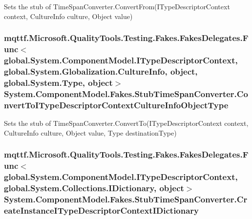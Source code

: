 Sets the stub of Time\-Span\-Converter.\-Convert\-From(\-I\-Type\-Descriptor\-Context context, Culture\-Info culture, Object value)

\hypertarget{class_system_1_1_component_model_1_1_fakes_1_1_stub_time_span_converter_ab11f414494c46937fe68b519b54aac31}{
\subsubsection[{Convert\-To\-I\-Type\-Descriptor\-Context\-Culture\-Info\-Object\-Type}]{\setlength{\rightskip}{0pt plus 5cm}mqttf.\-Microsoft.\-Quality\-Tools.\-Testing.\-Fakes.\-Fakes\-Delegates.\-Func$<$global.\-System.\-Component\-Model.\-I\-Type\-Descriptor\-Context, global.\-System.\-Globalization.\-Culture\-Info, object, global.\-System.\-Type, object$>$ System.\-Component\-Model.\-Fakes.\-Stub\-Time\-Span\-Converter.\-Convert\-To\-I\-Type\-Descriptor\-Context\-Culture\-Info\-Object\-Type}}\label{class_system_1_1_component_model_1_1_fakes_1_1_stub_time_span_converter_ab11f414494c46937fe68b519b54aac31}


Sets the stub of Time\-Span\-Converter.\-Convert\-To(\-I\-Type\-Descriptor\-Context context, Culture\-Info culture, Object value, Type destination\-Type)

\hypertarget{class_system_1_1_component_model_1_1_fakes_1_1_stub_time_span_converter_a621d7ec8410dfdc6b63ef3b8a3912910}{
\subsubsection[{Create\-Instance\-I\-Type\-Descriptor\-Context\-I\-Dictionary}]{\setlength{\rightskip}{0pt plus 5cm}mqttf.\-Microsoft.\-Quality\-Tools.\-Testing.\-Fakes.\-Fakes\-Delegates.\-Func$<$global.\-System.\-Component\-Model.\-I\-Type\-Descriptor\-Context, global.\-System.\-Collections.\-I\-Dictionary, object$>$ System.\-Component\-Model.\-Fakes.\-Stub\-Time\-Span\-Converter.\-Create\-Instance\-I\-Type\-Descriptor\-Context\-I\-Dictionary}}\label{class_system_1_1_component_model_1_1_fakes_1_1_stub_time_span_converter_a621d7ec8410dfdc6b63ef3b8a3912910}



